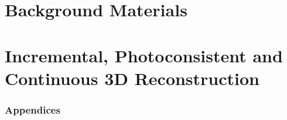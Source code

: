 \documentclass[10pt,twoside,openright,english,italian]{book}%
\begin{document}

\maketitle

\pagestyle{empty}

\cleardoublepage
\newpage

%

\cleardoublepage
\newpage

\pagestyle{fancy}
\setcounter{page}{1}





\tableofcontents
\cleardoublepage
\newpage

\setcounter{page}{1}

\cleardoublepage

\part{Background Materials}



\part{Incremental, Photoconsistent and Continuous 3D Reconstruction}






\appendix
{}
\section*{Appendices}





\cleardoublepage
{}
{}
\small


\end{document}
